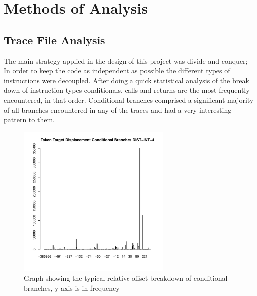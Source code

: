 \section{Methods of Analysis}
\subsection{Trace File Analysis}
The main strategy applied in the design of this project was divide and conquer; In order to keep the code as independent as possible the different types of instructions were decoupled. After doing a quick statistical analysis of the break down of instruction types conditionals, calls and returns are the most frequently encountered, in that order. Conditional branches comprised a significant majority of all branches encountered in any of the traces and had a very interesting pattern to them.
\begin{figure}
\begin{center}
\includegraphics[width=7.4cm]{"./Conditional Branches DIST-INT-4-histogram"}
\caption{Graph showing the typical relative offset breakdown of conditional branches, y axis is in frequency}
\end{center}
\end{figure}
